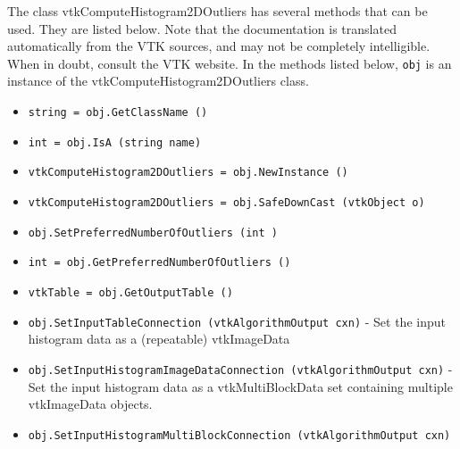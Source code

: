 The class vtkComputeHistogram2DOutliers has several methods that can be used.
  They are listed below.
Note that the documentation is translated automatically from the VTK sources,
and may not be completely intelligible.  When in doubt, consult the VTK website.
In the methods listed below, \verb|obj| is an instance of the vtkComputeHistogram2DOutliers class.
\begin{itemize}
\item  \verb|string = obj.GetClassName ()|

\item  \verb|int = obj.IsA (string name)|

\item  \verb|vtkComputeHistogram2DOutliers = obj.NewInstance ()|

\item  \verb|vtkComputeHistogram2DOutliers = obj.SafeDownCast (vtkObject o)|

\item  \verb|obj.SetPreferredNumberOfOutliers (int )|

\item  \verb|int = obj.GetPreferredNumberOfOutliers ()|

\item  \verb|vtkTable = obj.GetOutputTable ()|

\item  \verb|obj.SetInputTableConnection (vtkAlgorithmOutput cxn)| -  Set the input histogram data as a (repeatable) vtkImageData

\item  \verb|obj.SetInputHistogramImageDataConnection (vtkAlgorithmOutput cxn)| -  Set the input histogram data as a vtkMultiBlockData set
 containing multiple vtkImageData objects.

\item  \verb|obj.SetInputHistogramMultiBlockConnection (vtkAlgorithmOutput cxn)|

\end{itemize}
